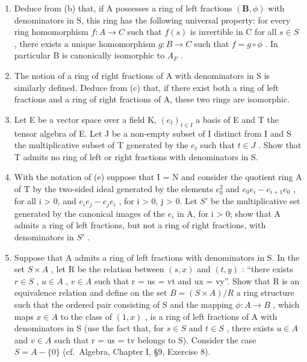\begin{enumerate}
\def\labelenumi{(\alph{enumi})}
\setcounter{enumi}{2}
\item
  Deduce from (b) that, if A possesses a ring of left fractions \((\mathbf{B}, \phi)\) with denominators in S, this ring has the following universal property: for every ring homomorphism \(f: A \to C\) such that \(f(s)\) is invertible in C for all \(s \in S\) , there exists a unique homomorphism \(g: B \to C\) such that \(f = g \circ \phi\) . In particular B is canonically isomorphic to \(A_{F}\) .
\item
  The notion of a ring of right fractions of A with denominators in S is similarly defined. Deduce from (c) that, if there exist both a ring of left fractions and a ring of right fractions of A, these two rings are isomorphic.
\item
  Let E be a vector space over a field K, \((e_{t})_{t\in I}\) a basis of E and T the tensor algebra of E. Let J be a non-empty subset of I distinct from I and S the multiplicative subset of T generated by the \(e_{t}\) such that \(t\in J\) . Show that T admits no ring of left or right fractions with denominators in S.
\item
  With the notation of (e) suppose that I = N and consider the quotient ring A of T by the two-sided ideal generated by the elements \(e_{0}^{2}\) and \(e_{0}e_{i} - e_{i+1}e_{0}\) , for all i \textgreater{} 0, and \(e_{i}e_{j} - e_{j}e_{i}\) , for i \textgreater{} 0, j \textgreater{} 0. Let \(S'\) be the multiplicative set generated by the canonical images of the \(e_{i}\) in A, for i \textgreater{} 0; show that A admits a ring of left fractions, but not a ring of right fractions, with denominators in \(S'\) .
\item
  Suppose that A admits a ring of left fractions with denominators in S. In the set \(S \times A\) , let R be the relation between \((s, x)\) and \((t, y)\) : ``there exists \(r \in S\) , \(u \in A\) , \(v \in A\) such that r = us = vt and ux = vy''. Show that R is an equivalence relation and define on the set \(B = (S \times A)/R\) a ring structure such that the ordered pair consisting of S and the mapping \(\phi: A \to B\) , which maps \(x \in A\) to the class of \((1, x)\) , is a ring of left fractions of A with denominators in S (use the fact that, for \(s \in S\) and \(t \in S\) , there exists \(u \in A\) and \(v \in A\) such that r = us = tv belongs to S). Consider the case \(S = A - \{0\}\) (cf.~Algebra, Chapter I, §9, Exercise 8).
\end{enumerate}

